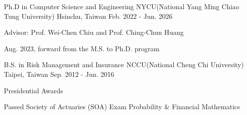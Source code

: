 

\begin{cventries}

  \cventry
    {Ph.D in Computer Science and Engineering} %
    {NYCU(National Yang Ming Chiao Tung University)} %
    {Hsinchu, Taiwan} %
    {Feb. 2022 - Jun. 2026} %
    {
      \begin{cvitems} %
        \item {Advisor: Prof. Wei-Chen Chiu and Prof. Ching-Chun Huang}
        \item {Aug. 2023, forward from the M.S. to Ph.D. program}
      \end{cvitems}
    }

  \cventry
    {B.S. in Risk Management and Insurance} %
    {NCCU(National Cheng Chi University)} %
    {Taipei, Taiwan} %
    {Sep. 2012 - Jun. 2016} %
    {
      \begin{cvitems} %
        \item {Presidential Awards}
        \item {Passed Society of Actuaries (SOA) Exam Probability \& Financial Mathematics}
      \end{cvitems}
    }

\end{cventries}
